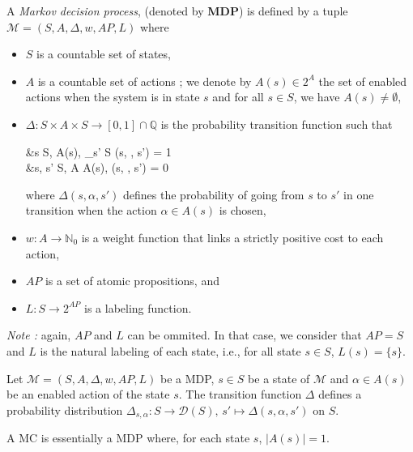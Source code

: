 \begin{definition}
	A \textit{Markov decision process}, (denoted by \textbf{MDP}) is defined by a tuple $\mathcal{M}  = (S, A, \Delta, w, AP, L)$ where
	\begin{itemize}
		\item $S$ is a countable set of states,
		\item $A$ is a countable set of actions ; we denote by $A(s) \in 2^A$  the set of enabled actions when the system is in state $s$ and for all $s \in S$,
    we have $A(s) \neq \emptyset$,
		\item $\Delta: S \times A \times S \rightarrow [0, 1] \cap \mathbb{Q}$ is the probability transition function such that
		\begin{flalign*}
			&\forall s \in S, \; \forall \alpha \in A(s), \; \sum_{s' \in S} \Delta(s, \alpha, s') = 1 \\
			 &\forall s, s' \in S, \; \forall \alpha \in A \setminus A(s), \; \Delta(s, \alpha, s') = 0
		\end{flalign*}

			where $\Delta(s, \alpha, s')$ defines the probability of going from $s$ to $s'$ in one transition when the action $\alpha \in A(s)$ is chosen,
    \item $w : A \rightarrow \mathbb{N}_0$ %
      is a weight function that links a strictly positive cost to each action,
    \item $AP$ is a set of atomic propositions, and
    \item $L : S \rightarrow 2^{AP}$ is a labeling function.
	\end{itemize}
  \textit{Note : }again, $AP$ and $L$ can be ommited. In that case, we consider that $AP=S$ and $L$ is the natural labeling of each state, i.e., for all state $s \in S$, $L(s) = \{s\}$.
\end{definition}

\begin{property}
  Let $\mathcal{M} = (S,A, \Delta, w, AP, L)$ be a MDP, $s \in S$ be a state of $\mathcal{M}$ and $\alpha \in A(s)$ be an enabled action of the state $s$. The transition function $\Delta$ defines a probability distribution $\Delta_{s, \alpha} : S \rightarrow \mathcal{D}(S), \, s' \mapsto \Delta(s, \alpha, s')$ on $S$.
\end{property}
\begin{property}
  A MC is essentially a MDP where, for each state $s$, $|A(s)| = 1$.
\end{property}

